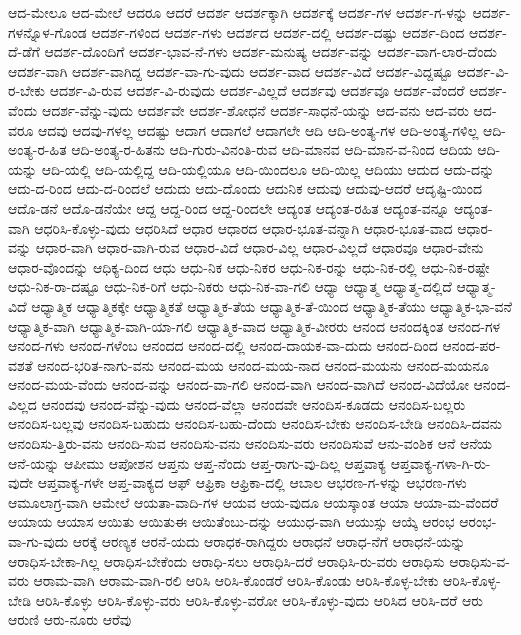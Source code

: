 {ಆದ-ಮೇಲೂ
ಆದ-ಮೇಲೆ
ಆದರೂ
ಆದರೆ
ಆದರ್ಶ
ಆದರ್ಶಕ್ಕಾಗಿ
ಆದರ್ಶಕ್ಕೆ
ಆದರ್ಶ-ಗಳ
ಆದರ್ಶ-ಗ-ಳನ್ನು
ಆದರ್ಶ-ಗಳನ್ನೊಳ-ಗೊಂಡ
ಆದರ್ಶ-ಗಳಿಂದ
ಆದರ್ಶ-ಗಳು
ಆದರ್ಶದ
ಆದರ್ಶ-ದಲ್ಲಿ
ಆದರ್ಶ-ದಷ್ಟು
ಆದರ್ಶ-ದಿಂದ
ಆದರ್ಶ-ದೆ-ಡೆಗೆ
ಆದರ್ಶ-ದೊಂದಿಗೆ
ಆದರ್ಶ-ಭಾವ-ನೆ-ಗಳು
ಆದರ್ಶ-ಮನುಷ್ಯ
ಆದರ್ಶ-ವನ್ನು
ಆದರ್ಶ-ವಾಗ-ಲಾರ-ದೆಂದು
ಆದರ್ಶ-ವಾಗಿ
ಆದರ್ಶ-ವಾಗಿದ್ದ
ಆದರ್ಶ-ವಾ-ಗು-ವುದು
ಆದರ್ಶ-ವಾದ
ಆದರ್ಶ-ವಿದೆ
ಆದರ್ಶ-ವಿದ್ದಷ್ಟೂ
ಆದರ್ಶ-ವಿ-ರ-ಬೇಕು
ಆದರ್ಶ-ವಿ-ರುವ
ಆದರ್ಶ-ವಿ-ರುವುದು
ಆದರ್ಶ-ವಿಲ್ಲದೆ
ಆದರ್ಶವು
ಆದರ್ಶವೂ
ಆದರ್ಶ-ವೆಂದರೆ
ಆದರ್ಶ-ವೆಂದು
ಆದರ್ಶ-ವೆನ್ನು-ವುದು
ಆದರ್ಶವೇ
ಆದರ್ಶ-ಶೋಧನೆ
ಆದರ್ಶ-ಸಾಧನೆ-ಯನ್ನು
ಆದ-ವನು
ಆದ-ವರು
ಆದ-ವರೂ
ಆದವು
ಆದವು-ಗಳಲ್ಲ
ಆದಷ್ಟು
ಆದಾಗ
ಆದಾಗಲೆ
ಆದಾಗಲೇ
ಆದಿ
ಆದಿ-ಅಂತ್ಯ-ಗಳ
ಆದಿ-ಅಂತ್ಯ-ಗಳಿಲ್ಲ
ಆದಿ-ಅಂತ್ಯ-ರ-ಹಿತ
ಆದಿ-ಅಂತ್ಯ-ರ-ಹಿತನು
ಆದಿ-ಗುರು-ವಿನಂತಿ-ರುವ
ಆದಿ-ಮಾನವ
ಆದಿ-ಮಾನ-ವ-ನಿಂದ
ಆದಿಯ
ಆದಿ-ಯನ್ನು
ಆದಿ-ಯಲ್ಲಿ
ಆದಿ-ಯಲ್ಲಿದ್ದ
ಆದಿ-ಯಲ್ಲಿಯೂ
ಆದಿ-ಯಿಂದಲೂ
ಆದಿ-ಯಿಲ್ಲ
ಆದಿಯು
ಆದುದ
ಆದು-ದನ್ನು
ಆದು-ದ-ರಿಂದ
ಆದು-ದ-ರಿಂದಲೆ
ಆದುದು
ಆದು-ದೊಂದು
ಆದುನಿಕ
ಆದುವು
ಆದುವು-ಆದರೆ
ಆದೃಷ್ಟಿ-ಯಿಂದ
ಆದೊ-ಡನೆ
ಆದೊ-ಡನೆಯೇ
ಆದ್ದ
ಆದ್ದ-ರಿಂದ
ಆದ್ದ-ರಿಂದಲೇ
ಆದ್ಯಂತ
ಆದ್ಯಂತ-ರಹಿತ
ಆದ್ಯಂತ-ವನ್ನೂ
ಆದ್ಯಂತ-ವಾಗಿ
ಆಧರಿಸಿ-ಕೊಳ್ಳು-ವುದು
ಆಧರಿಸಿದೆ
ಆಧಾರ
ಆಧಾರದ
ಆಧಾರ-ಭೂತ-ವನ್ನಾಗಿ
ಆಧಾರ-ಭೂತ-ವಾದ
ಆಧಾರ-ವನ್ನು
ಆಧಾರ-ವಾಗಿ
ಆಧಾರ-ವಾಗಿ-ರುವ
ಆಧಾರ-ವಿದೆ
ಆಧಾರ-ವಿಲ್ಲ
ಆಧಾರ-ವಿಲ್ಲದೆ
ಆಧಾರವೂ
ಆಧಾರ-ವೇನು
ಆಧಾರ-ವೊಂದನ್ನು
ಆಧಿಕ್ಯ-ದಿಂದ
ಆಧು
ಆಧು-ನಿಕ
ಆಧು-ನಿಕರ
ಆಧು-ನಿಕ-ರನ್ನು
ಆಧು-ನಿಕ-ರಲ್ಲಿ
ಆಧು-ನಿಕ-ರಷ್ಟೇ
ಆಧು-ನಿಕ-ರಾ-ದಷ್ಟೂ
ಆಧು-ನಿಕ-ರಿಗೆ
ಆಧು-ನಿಕರು
ಆಧು-ನಿಕ-ವಾ-ಗಲಿ
ಆಧ್ಯಾ
ಆಧ್ಯಾತ್ಮ
ಆಧ್ಯಾತ್ಮ-ದಲ್ಲಿದೆ
ಆಧ್ಯಾತ್ಮ-ವಿದೆ
ಆಧ್ಯಾತ್ಮಿಕ
ಆಧ್ಯಾತ್ಮಿಕಕ್ಕೇ
ಆಧ್ಯಾತ್ಮಿಕತೆ
ಆಧ್ಯಾತ್ಮಿಕ-ತೆಯ
ಆಧ್ಯಾತ್ಮಿಕ-ತೆ-ಯಿಂದ
ಆಧ್ಯಾತ್ಮಿಕ-ತೆಯು
ಆಧ್ಯಾತ್ಮಿಕ-ಭಾ-ವನೆ
ಆಧ್ಯಾತ್ಮಿಕ-ವಾಗಿ
ಆಧ್ಯಾತ್ಮಿಕ-ವಾಗಿ-ಯಾ-ಗಲಿ
ಆಧ್ಯಾತ್ಮಿಕ-ವಾದ
ಆಧ್ಯಾತ್ಮಿಕ-ವೀರರು
ಆನಂದ
ಆನಂದಕ್ಕಿಂತ
ಆನಂದ-ಗಳ
ಆನಂದ-ಗಳು
ಆನಂದ-ಗಳೆಂಬ
ಆನಂದದ
ಆನಂದ-ದಲ್ಲಿ
ಆನಂದ-ದಾಯಕ-ವಾ-ದುದು
ಆನಂದ-ದಿಂದ
ಆನಂದ-ಪರ-ವಶತೆ
ಆನಂದ-ಭರಿತ-ನಾಗು-ವನು
ಆನಂದ-ಮಯ
ಆನಂದ-ಮಯ-ನಾದ
ಆನಂದ-ಮಯನು
ಆನಂದ-ಮಯನೂ
ಆನಂದ-ಮಯ-ವೆಂದು
ಆನಂದ-ವನ್ನು
ಆನಂದ-ವಾ-ಗಲಿ
ಆನಂದ-ವಾಗಿ
ಆನಂದ-ವಾಗಿದೆ
ಆನಂದ-ವಿದೆಯೋ
ಆನಂದ-ವಿಲ್ಲದ
ಆನಂದವು
ಆನಂದ-ವೆನ್ನು-ವುದು
ಆನಂದ-ವೆಲ್ಲಾ
ಆನಂದವೇ
ಆನಂದಿಸ-ಕೂಡದು
ಆನಂದಿಸ-ಬಲ್ಲರು
ಆನಂದಿಸ-ಬಲ್ಲವು
ಆನಂದಿಸ-ಬಹುದು
ಆನಂದಿಸ-ಬಹು-ದೆಂದು
ಆನಂದಿಸ-ಬೇಕು
ಆನಂದಿಸ-ಬೇಡಿ
ಆನಂದಿಸಿ-ದವನು
ಆನಂದಿಸು-ತ್ತಿರು-ವನು
ಆನಂದಿ-ಸುವ
ಆನಂದಿಸು-ವನು
ಆನಂದಿಸು-ವರು
ಆನಂದಿಸುವೆ
ಆನು-ವಂಶಿಕ
ಆನೆ
ಆನೆಯ
ಆನೆ-ಯನ್ನು
ಆಪೀಮು
ಆಪೋಶನ
ಆಪ್ತನು
ಆಪ್ತ-ನೆಂದು
ಆಪ್ತ-ರಾಗು-ವು-ದಿಲ್ಲ
ಆಪ್ತವಾಕ್ಯ
ಆಪ್ತವಾಕ್ಯ-ಗಳಾ-ಗಿ-ರು-ವುದೇ
ಆಪ್ತವಾಕ್ಯ-ಗಳೇ
ಆಪ್ತ-ವಾಕ್ಯದ
ಆಫ್
ಆಫ್ರಿಕಾ
ಆಫ್ರಿಕಾ-ದಲ್ಲಿ
ಆಬಾಲ
ಆಭರಣ-ಗ-ಳನ್ನು
ಆಭರಣ-ಗಳು
ಆಮೂಲಾಗ್ರ-ವಾಗಿ
ಆಮೇಲೆ
ಆಯತಾ-ವಾದಿ-ಗಳ
ಆಯವ
ಆಯ-ವುದೂ
ಆಯಸ್ಕಾಂತ
ಆಯಾ
ಆಯಾ-ಮ-ವೆಂದರೆ
ಆಯಾಯ
ಆಯಾಸ
ಆಯಿತು
ಆಯಿತುಈ
ಆಯಿತೆಂಬು-ದನ್ನು
ಆಯುಧ-ವಾಗಿ
ಆಯುಸ್ಸು
ಆಯ್ಕೆ
ಆರಂಭ
ಆರಂಭ-ವಾ-ಗು-ವುದು
ಆರಕ್ಕೆ
ಆರಣ್ಯಕ
ಆರನೆ-ಯದು
ಆರಾಧಕ-ರಾಗಿದ್ದರು
ಆರಾಧನೆ
ಆರಾಧ-ನೆಗೆ
ಆರಾಧನೆ-ಯನ್ನು
ಆರಾಧಿಸ-ಬೇಕಾ-ಗಿಲ್ಲ
ಆರಾಧಿಸ-ಬೇಕೆಂದು
ಆರಾಧಿ-ಸಲು
ಆರಾಧಿಸಿ-ದರೆ
ಆರಾಧಿಸಿ-ರು-ವರು
ಆರಾಧಿಸು
ಆರಾಧಿಸು-ವ-ವರು
ಆರಾಮ-ವಾಗಿ
ಆರಾಮ-ವಾಗಿ-ರಲಿ
ಆರಿಸಿ
ಆರಿಸಿ-ಕೊಂಡರೆ
ಆರಿಸಿ-ಕೊಂಡು
ಆರಿಸಿ-ಕೊಳ್ಳ-ಬೇಕು
ಆರಿಸಿ-ಕೊಳ್ಳ-ಬೇಡಿ
ಆರಿಸಿ-ಕೊಳ್ಳು
ಆರಿಸಿ-ಕೊಳ್ಳು-ವರು
ಆರಿಸಿ-ಕೊಳ್ಳು-ವರೋ
ಆರಿಸಿ-ಕೊಳ್ಳು-ವುದು
ಆರಿಸಿದ
ಆರಿಸಿ-ದರೆ
ಆರು
ಆರುಣಿ
ಆರು-ನೂರು
ಆರೆವು
}
